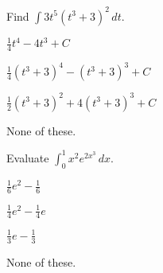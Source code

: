 \documentclass[12pt]{exam}
\newcommand{\<}{(}
\renewcommand{\>}{)}
\begin{document}
\begin{center}
\end{center}
\vspace{0.1in}

\vspace{12pt}

\begin{questions}\setcounter{question}{2}

\question
Find \(\int 3t^5(t^3+3)^2\,dt\).
\begin{choices}
\item \(\frac{1}{4}t^4-4t^3+C\)
\item \(\frac{1}{4}(t^3+3)^4-(t^3+3)^3+C\)
\item \(\frac{1}{2}(t^3+3)^2+4(t^3+3)^3+C\)
\item None of these.
\end{choices}


\question
Evaluate \(\int_0^1 x^2e^{2x^3}\,dx\).
\begin{choices}
\item \(\frac{1}{6}e^2-\frac{1}{6}\)
\item \(\frac{1}{4}e^2-\frac{1}{4}e\)
\item \(\frac{1}{3}e-\frac{1}{3}\)
\item None of these.
\end{choices}



\end{questions}
\end{document}
